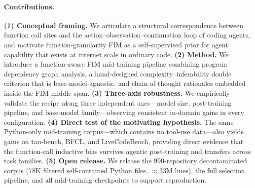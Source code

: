 \paragraph{Contributions.}
\textbf{(1) Conceptual framing.} We articulate a structural correspondence
between function call sites and the action--observation--continuation loop
of coding agents, and motivate function-granularity FIM as a
self-supervised prior for agent capability that exists at internet scale
in ordinary code.
\textbf{(2) Method.} We introduce a function-aware FIM mid-training
pipeline combining program dependency graph analysis, a hand-designed
complexity--inferability double criterion that is base-model-agnostic, and
chain-of-thought rationales embedded inside the FIM middle span.
\textbf{(3) Three-axis robustness.} We empirically validate the recipe
along three independent axes---model size, post-training pipeline, and
base-model family---observing consistent in-domain gains in every
configuration.
\textbf{(4) Direct test of the motivating hypothesis.} The same Python-only
mid-training corpus---which contains no tool-use data---also yields gains
on tau-bench, BFCL, and LiveCodeBench, providing direct evidence that the
function-call inductive bias survives agentic post-training and transfers
across task families.
\textbf{(5) Open release.} We release the 990-repository decontaminated
corpus (78K filtered self-contained Python files, $\approx 33\mathrm{M}$
lines), the full selection pipeline, and all mid-training checkpoints to
support reproduction.